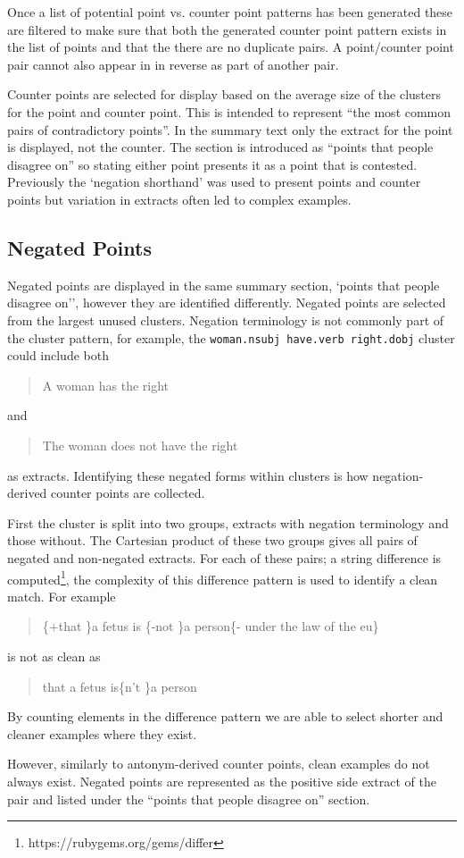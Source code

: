       Once a list of potential point vs. counter point patterns has been generated these are filtered to make sure that both the generated counter point pattern exists in the list of points and that the there are no duplicate pairs. A point/counter point pair cannot also appear in in reverse as part of another pair.

      Counter points are selected for display based on the average size of the clusters for the point and counter point. This is intended to represent ``the most common pairs of contradictory points''. In the summary text only the extract for the point is displayed, not the counter. The section is introduced as ``points that people disagree on'' so stating either point presents it as a point that is contested. Previously the `negation shorthand' was used to present points and counter points but variation in extracts often led to complex examples.

    \subsection{Negated Points}
      Negated points are displayed in the same summary section, `points that people disagree on'', however they are identified differently. Negated points are selected from the largest unused clusters. Negation terminology is not commonly part of the cluster pattern, for example, the \texttt{woman.nsubj have.verb right.dobj} cluster could include both \blockquote{A woman has the right} and \blockquote{The woman does not have the right} as extracts. Identifying these negated forms within clusters is how negation-derived counter points are collected.

      First the cluster is split into two groups, extracts with negation terminology and those without. The Cartesian product of these two groups gives all pairs of negated and non-negated extracts. For each of these pairs; a string difference is computed\footnote{https://rubygems.org/gems/differ}, the complexity of this difference pattern is used to identify a clean match. For example \blockquote{\{+that \}a fetus is \{-not \}a person\{- under the law of the eu\}} is not as clean as \blockquote{that a fetus is\{n't \}a person}. By counting elements in the difference pattern we are able to select shorter and cleaner examples where they exist.

      However, similarly to antonym-derived counter points, clean examples do not always exist. Negated points are represented as the positive side extract of the pair and listed under the ``points that people disagree on'' section.

